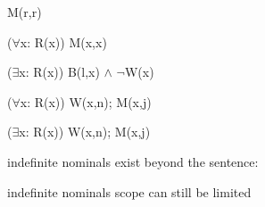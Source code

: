 \documentclass[headrule,footrule]{foils}
\begin{document}
\begin{exe}
  \ex 
  \begin{xlist}
    \ex {}
    \ex M(r,r)
  \end{xlist}
 \ex 
  \begin{xlist}
    \ex {}
    \ex ($\forall$x: R(x)) M(x,x)
  \end{xlist}
 \ex 
  \begin{xlist}
    \ex {}
    \ex ($\exists$x: R(x)) B(l,x) $\wedge$ $\neg$W(x)
  \end{xlist}
 \ex 
  \begin{xlist}
    \ex {}
    \ex ($\forall$x: R(x)) W(x,n); M(x,j)\hfill {}
  \end{xlist}
 \ex 
  \begin{xlist}
    \ex {}
    \ex ($\exists$x: R(x)) W(x,n); M(x,j)\hfill {}
  \end{xlist}
  \trans indefinite nominals exist beyond the sentence: 
\ex 
  \begin{xlist}
    \ex {}
  \end{xlist}
  \trans indefinite nominals scope can still be limited
\end{exe}



\end{document}

